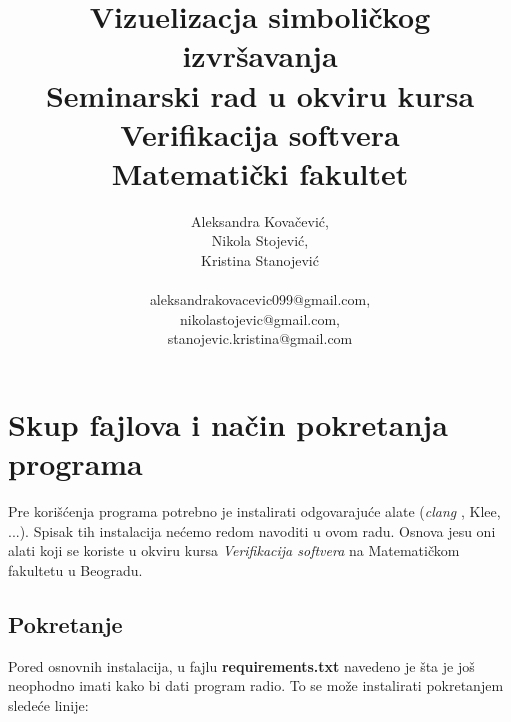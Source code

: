 \documentclass[a4paper]{article}
\begin{document}
\title{Vizuelizacja simboličkog izvršavanja\\ \small{Seminarski rad u okviru kursa\\Verifikacija softvera\\ Matematički fakultet}}

\author{Aleksandra Kovačević, \\Nikola Stojević, \\Kristina Stanojević\\ \\aleksandrakovacevic099@gmail.com, \\nikolastojevic@gmail.com, \\stanojevic.kristina@gmail.com}


\maketitle



\tableofcontents

\newpage

\section{Skup fajlova i način pokretanja programa}

Pre korišćenja programa potrebno je instalirati odgovarajuće alate (\textit{clang} \cite{clang}, Klee, ...). Spisak tih instalacija nećemo redom navoditi u ovom radu. Osnova jesu oni alati koji se koriste u okviru kursa \textit{Verifikacija softvera} na Matematičkom fakultetu u Beogradu.

\subsection{Pokretanje}

Pored osnovnih instalacija, u fajlu \textbf{requirements.txt} navedeno je šta je još neophodno imati kako bi dati program radio. To se može instalirati pokretanjem sledeće linije:
\end{document}
